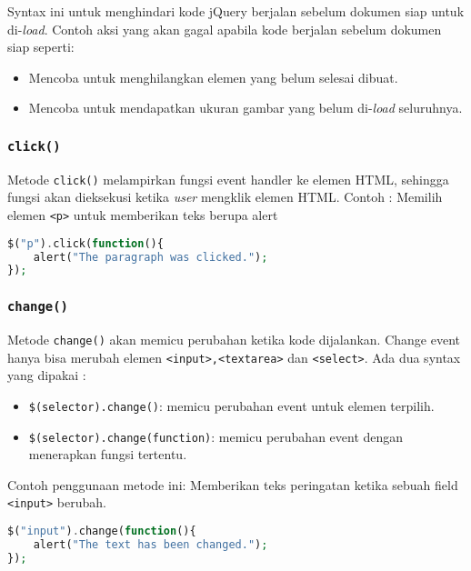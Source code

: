 \begin{itemize}
Syntax ini untuk menghindari kode jQuery berjalan sebelum dokumen siap untuk di-\textit{load}. Contoh aksi yang akan gagal apabila kode berjalan sebelum dokumen siap seperti:
\begin{itemize}
	\item Mencoba untuk menghilangkan elemen yang belum selesai dibuat.
	\item Mencoba untuk mendapatkan ukuran gambar yang belum di-\textit{load} seluruhnya.
\end{itemize}


\subsubsection{\texttt{click()}}
Metode \texttt{click()} melampirkan fungsi event handler ke elemen HTML, sehingga fungsi akan dieksekusi ketika \textit{user} mengklik elemen HTML.
Contoh : Memilih elemen \texttt{<p>} untuk memberikan teks berupa alert
\begin{lstlisting}[frame=single, language=PHP]
$("p").click(function(){
	alert("The paragraph was clicked.");
});

\end{lstlisting}

\subsubsection{\texttt{change()}}
Metode \texttt{change()} akan memicu perubahan ketika kode dijalankan. Change event hanya bisa merubah elemen \texttt{<input>,<textarea>} dan \texttt{<select>}.
Ada dua syntax yang dipakai :
\begin{itemize}
	\item \texttt{\$(selector).change()}: memicu perubahan event untuk elemen terpilih.
	\item \texttt{\$(selector).change(function)}: memicu perubahan event dengan menerapkan fungsi tertentu.
\end{itemize}
Contoh penggunaan metode ini: Memberikan teks peringatan ketika sebuah field \texttt{<input>} berubah.
\begin{lstlisting}[frame=single, language=PHP]
$("input").change(function(){
	alert("The text has been changed.");
});
\end{lstlisting}


\end{itemize}
